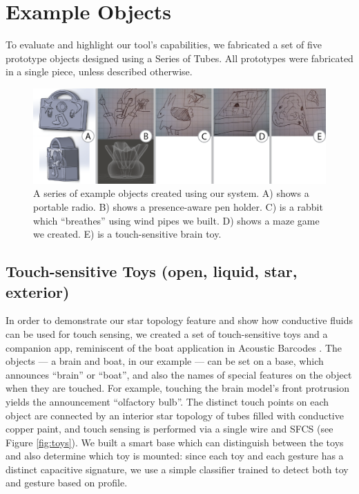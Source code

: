 \section{Example Objects}

To evaluate and highlight our tool's capabilities, we fabricated a set of five prototype objects designed using a Series of Tubes.  All prototypes were fabricated in a single piece, unless described otherwise.

\begin{figure}[h!]
\centering
    \includegraphics[width=7in]{figures/examples.png}
\caption{A series of example objects created using our system.  A) shows a portable radio.  B) shows a presence-aware pen holder.  C) is a rabbit which ``breathes'' using wind pipes we built.  D) shows a maze game we created.  E) is a touch-sensitive brain toy.  }
\label{fig:examples}
\end{figure}

\subsection{Touch-sensitive Toys (open, liquid, star, exterior)}

In order to demonstrate our star topology feature and show how conductive fluids can be used for touch sensing, we created a set of touch-sensitive toys and a companion app, reminiscent of the boat application in Acoustic Barcodes \cite{Harrison-acoustic}. The objects --- a brain and boat, in our example --- can be set on a base, which announces ``brain'' or ``boat'', and also the names of special features on the object when they are touched. For example, touching the brain model's front protrusion yields the announcement ``olfactory bulb''. The distinct touch points on each object are connected by an interior star topology of tubes filled with conductive copper paint, and touch sensing is performed via a single wire and SFCS (see Figure \ref{fig:toys}).  We built a smart base which can distinguish between the toys and also determine which toy is mounted: since each toy and each gesture has a distinct capacitive signature, we use a simple classifier trained to detect both toy and gesture based on profile.

